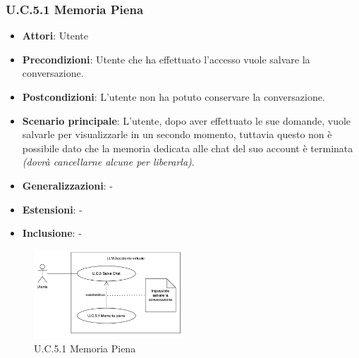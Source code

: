 \subsubsection{U.C.5.1 Memoria Piena}
\begin{itemize}
    \item \textbf{Attori}: Utente
    \item \textbf{Precondizioni}: Utente che ha effettuato l'accesso vuole salvare la conversazione.
    \item \textbf{Postcondizioni}: L'utente non ha potuto conservare la conversazione.
    \item \textbf{Scenario principale}: L’utente, dopo aver effettuato le sue domande, vuole salvarle per visualizzarle in un secondo momento, tuttavia questo non è possibile dato che la memoria dedicata alle chat del suo account è terminata \textit{(dovrà cancellarne alcune per liberarla)}.
    \item \textbf{Generalizzazioni}: -
    \item \textbf{Estensioni}: -
    \item \textbf{Inclusione}: -
\end{itemize}
\begin{figure}[H]
    \centering
    \includegraphics[width=0.5\textwidth]{img/UC5-1.png}
    \caption{U.C.5.1 Memoria Piena}
\end{figure}
